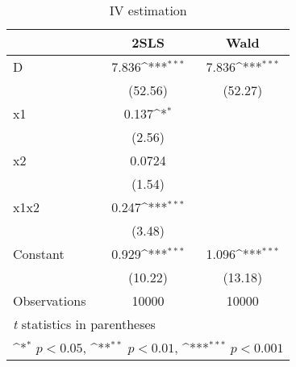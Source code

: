 \begin{table}[htbp]\centering
\def\sym#1{\ifmmode^{#1}\else\(^{#1}\)\fi}
\caption{IV estimation\label{tab:IV-2SLS-IV-Wald}}
\begin{tabular}{l*{2}{c}}
\toprule
                    &\multicolumn{1}{c}{2SLS}&\multicolumn{1}{c}{Wald}\\
\midrule
D                   &       7.836\sym{***}&       7.836\sym{***}\\
                    &     (52.56)         &     (52.27)         \\
\addlinespace
x1                  &       0.137\sym{*}  &                     \\
                    &      (2.56)         &                     \\
\addlinespace
x2                  &      0.0724         &                     \\
                    &      (1.54)         &                     \\
\addlinespace
x1x2                &       0.247\sym{***}&                     \\
                    &      (3.48)         &                     \\
\addlinespace
Constant            &       0.929\sym{***}&       1.096\sym{***}\\
                    &     (10.22)         &     (13.18)         \\
\midrule
Observations        &       10000         &       10000         \\
\bottomrule
\multicolumn{3}{l}{\footnotesize \textit{t} statistics in parentheses}\\
\multicolumn{3}{l}{\footnotesize \sym{*} \(p<0.05\), \sym{**} \(p<0.01\), \sym{***} \(p<0.001\)}\\
\end{tabular}
\end{table}
